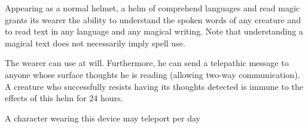 \begin{comment}
Once all its jewels have lost their magic, the helm loses its powers and the gems turn to worthless powder. Removing a jewel destroys it.

If a creature wearing the helm is damaged by magical fire (after the fire protection is taken into account) and fails an additional DC 15 Will save, the remaining gems on the helm overload and detonate. Remaining diamonds become prismatic sprays that each randomly target a creature within range (possibly the wearer), rubies become straight-line walls of fire extending outward in a random direction from the helm wearer, and fire opals become fireballs centered on the helm wearer. The opals and the helm itself are destroyed.

Strong varied; CL 13th; Craft Wondrous Item, detect undead, fireball, flame blade, light, prismatic spray, protection from energy, wall of fire; Price 125,000 gp;Weight 3 lb.
\end{comment}

 Appearing as a normal helmet, a helm of comprehend languages and read magic grants its wearer the ability to understand the spoken words of any creature and to read text in any language and any magical writing. Note that understanding a magical text does not necessarily imply spell use.

 The wearer can use  at will. Furthermore, he can send a telepathic message to anyone whose surface thoughts he is reading (allowing two-way communication). A creature who successfully resists having its thoughts detected is immune to the effects of this helm for 24 hours.

 A character wearing this device may teleport  per day 

